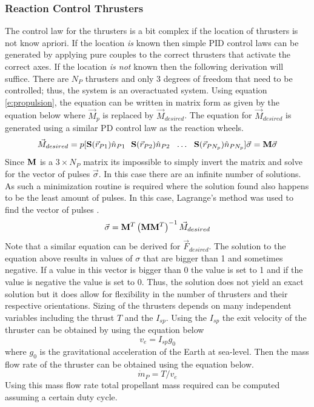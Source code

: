 \documentclass{article}
\begin{document}
\subsubsection{Reaction Control Thrusters}

The control law for the thrusters is a bit complex if the location of
thrusters is not know apriori. If the location {\it is} known then
simple PID control laws can be generated by applying pure couples to
the correct thrusters that activate the correct axes. If the location
{\it is not} known then the following derivation will suffice. There
are $N_P$ thrusters and only 3 degrees of freedom that need to be
controlled; thus, the system is an overactuated system. Using equation
\ref{e:propulsion}, the equation can be written in matrix form as
given by the equation below where $\vec{M}_p$ is replaced by
$\vec{M}_{desired}$. The equation for $\vec{M}_{desired}$ is generated
using a similar PD control law as the reaction wheels. 
\begin{equation}
  \vec{M}_{desired} = p[{\bf S}(\vec{r}_{P1})\hat{n}_{P1}~~{\bf
      S}(\vec{r}_{P2})\hat{n}_{P2}~~\hdots~~{\bf
      S}(\vec{r}_{P{N_p}})\hat{n}_{P{N_p}}]\vec{\sigma} = {\bf M}\vec{\sigma}
\end{equation}
Since ${\bf M}$ is a $3\times{N_P}$ matrix its impossible to simply
invert the matrix and solve for the vector of pulses
$\vec{\sigma}$. In this case there are an infinite number of
solutions. As such a minimization routine is required where the
solution found also happens to be the least amount of pulses. In this
case, Lagrange's method was used to find the vector of pulses \cite{lagrange}.
\begin{equation}
  \vec{\sigma} = {\bf M}^T\left({\bf M}{\bf M}^T\right)^{-1}\vec{M}_{desired}
\end{equation}
Note that a similar equation can be derived for
$\vec{F}_{desired}$. The solution to the equation above results in
values of $\sigma$ that are bigger than 1 and sometimes negative. If a
value in this vector is bigger than 0 the value is set to 1 and
if the value is negative the value is set to 0. Thus, the solution
does not yield an exact solution but it does allow for flexibility in
the number of thrusters and their respective orientations. Sizing of
the thrusters depends on many independent variables 
including the thrust $T$ and the $I_{sp}$. Using the $I_{sp}$ the exit
velocity of the thruster can be obtained by using the equation below
\begin{equation}
  v_e = I_{sp}g_0
\end{equation}
where $g_0$ is the gravitational acceleration of the Earth at
sea-level. Then the mass flow rate of the thruster can be obtained
using the equation below.
\begin{equation}
  \dot{m}_P = T/v_e
\end{equation}
Using this mass flow rate total propellant mass required can be
computed assuming a certain duty cycle.
\end{document}
